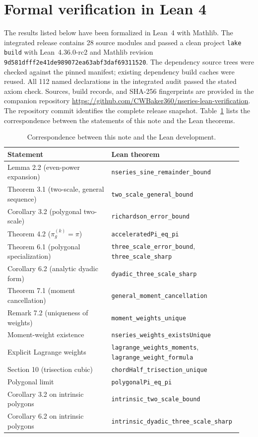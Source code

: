 \section{Formal verification in Lean 4}
\label{sec:lean}

The results listed below have been formalized in Lean~4 with Mathlib.
The integrated release contains 28 source modules and passed a clean project
\texttt{lake build} with Lean~4.36.0-rc2 and Mathlib revision
\texttt{9d581dfff2e41de989072ea63abf3daf69311520}.
The dependency source trees were checked against the pinned manifest;
existing dependency build caches were reused. All 112 named declarations in
the integrated audit passed the stated axiom check. Sources, build records,
and SHA-256 fingerprints are provided in the companion repository
\url{https://github.com/CWBaker360/nseries-lean-verification}.
The repository commit identifies the complete release snapshot.
Table~\ref{tab:lean} lists the correspondence between the statements of this
note and the Lean theorems.

\begin{table}[h]
\centering
\begin{tabular}{@{}p{0.43\linewidth}p{0.51\linewidth}@{}}
\toprule
Statement & Lean theorem \\
\midrule
Lemma 2.2 (even-power expansion) & \texttt{nseries\_sine\_remainder\_bound} \\
Theorem 3.1 (two-scale, general sequence) & \texttt{two\_scale\_general\_bound} \\
Corollary 3.2 (polygonal two-scale) & \texttt{richardson\_error\_bound} \\
Theorem 4.2 ($\pi_g^{(k)}=\pi$) & \texttt{acceleratedPi\_eq\_pi} \\
Theorem 6.1 (polygonal specialization) & \texttt{three\_scale\_error\_bound}, \texttt{three\_scale\_sharp} \\
Corollary 6.2 (analytic dyadic form) & \texttt{dyadic\_three\_scale\_sharp} \\
Theorem 7.1 (moment cancellation) & \texttt{general\_moment\_cancellation} \\
Remark 7.2 (uniqueness of weights) & \texttt{moment\_weights\_unique} \\
Moment-weight existence & \texttt{nseries\_weights\_existsUnique} \\
Explicit Lagrange weights & \texttt{lagrange\_weights\_moments}, \texttt{lagrange\_weight\_formula} \\
Section 10 (trisection cubic) & \texttt{chordHalf\_trisection\_unique} \\
Polygonal limit & \texttt{polygonalPi\_eq\_pi} \\
Corollary 3.2 on intrinsic polygons & \texttt{intrinsic\_two\_scale\_bound} \\
Corollary 6.2 on intrinsic polygons & \texttt{intrinsic\_dyadic\_three\_scale\_sharp} \\
\bottomrule
\end{tabular}
\caption{Correspondence between this note and the Lean development.}
\label{tab:lean}
\end{table}


